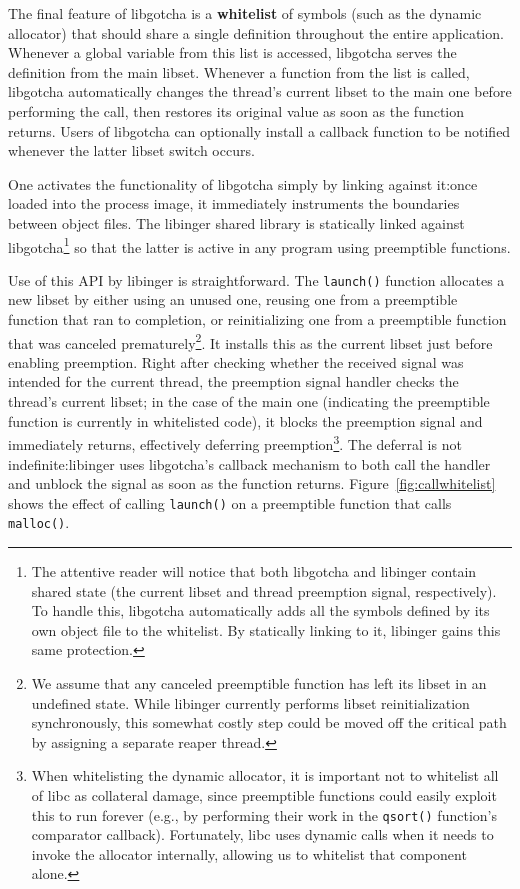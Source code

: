 The final feature of libgotcha is a \textbf{whitelist} of symbols (such as the
dynamic allocator) that should share a single definition throughout the entire
application.  Whenever a global variable from this list is accessed, libgotcha serves
the definition from the main libset.  Whenever a function from the list is called,
libgotcha automatically changes the thread's current libset to the main one before
performing the call, then restores its original value as soon as the function
returns.  Users of libgotcha can optionally install a callback function to be
notified whenever the latter libset switch occurs.

One activates the functionality of libgotcha simply by linking against it:\@ once
loaded into the process image, it immediately instruments the boundaries between
object files.  The libinger shared library is statically linked against
libgotcha\footnote{The attentive reader will notice that both libgotcha and libinger
contain shared state (the current libset and thread preemption signal, respectively).
To handle this, libgotcha automatically adds all the symbols defined by its own
object file to the whitelist.  By statically linking to it, libinger gains this same
protection.} so that the latter is active in any program using preemptible functions.

Use of this API by libinger is straightforward.  The \texttt{launch()} function
allocates a new libset by either using an unused one, reusing one from a preemptible
function that ran to completion, or reinitializing one from a preemptible function
that was canceled prematurely\footnote{We assume that any canceled preemptible
function has left its libset in an undefined state.  While libinger currently
performs libset reinitialization synchronously, this somewhat costly step could be
moved off the critical path by assigning a separate reaper thread.}.  It installs
this as the current libset just before enabling preemption.  Right after checking
whether the received signal was intended for the current thread, the preemption
signal handler checks the thread's current libset; in the case of the main one
(indicating the preemptible function is currently in whitelisted code), it blocks the
preemption signal and immediately returns, effectively deferring
preemption\footnote{When whitelisting the dynamic allocator, it is important not to
whitelist all of libc as collateral damage, since preemptible functions could easily
exploit this to run forever (e.g., by performing their work in the \texttt{qsort()}
function's comparator callback).  Fortunately, libc uses dynamic calls when it needs
to invoke the allocator internally, allowing us to whitelist that component alone.}.
The deferral is not indefinite:\@ libinger uses libgotcha's callback mechanism to
both call the handler and unblock the signal as soon as the function returns.
Figure~\ref{fig:callwhitelist} shows the effect of calling \texttt{launch()} on a
preemptible function that calls \texttt{malloc()}.

